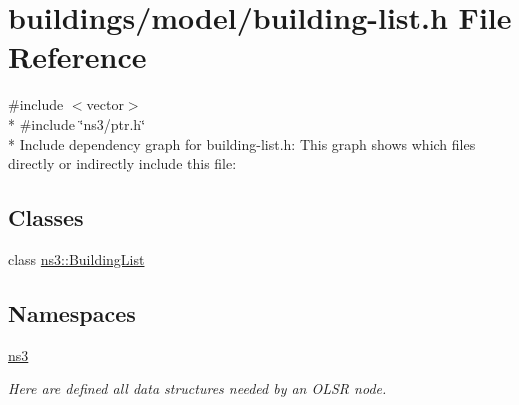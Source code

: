 \hypertarget{building-list_8h}{}\section{buildings/model/building-\/list.h File Reference}
\label{building-list_8h}
{\ttfamily \#include $<$vector$>$}\\*
{\ttfamily \#include \char`\"{}ns3/ptr.\+h\char`\"{}}\\*
Include dependency graph for building-\/list.h\+:
This graph shows which files directly or indirectly include this file\+:
\subsection*{Classes}
\begin{DoxyCompactItemize}
\item 
class \hyperlink{classns3_1_1BuildingList}{ns3\+::\+Building\+List}
\end{DoxyCompactItemize}
\subsection*{Namespaces}
\begin{DoxyCompactItemize}
\item 
 \hyperlink{namespacens3}{ns3}
\begin{DoxyCompactList}\small\item\em Here are defined all data structures needed by an O\+L\+SR node. \end{DoxyCompactList}\end{DoxyCompactItemize}
